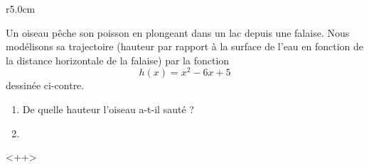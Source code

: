
\begin{exercice}\label{exosmath-0632}

\begin{wrapfigure}{r}{5.0cm}
   \vspace{-5.5cm}        %
   \centering
   
\end{wrapfigure}

    Un oiseau pêche son poisson en plongeant dans un lac depuis une falaise. Nous modélisons sa trajectoire (hauteur par rapport à la surface de l'eau en fonction de la distance horizontale de la falaise) par la fonction
    \begin{equation*}
        h(x)=x^2-6x+5
    \end{equation*}
    dessinée ci-contre.
    \begin{enumerate}
        \item
            De quelle hauteur l'oiseau a-t-il sauté ?
        \item

    \end{enumerate}
    <++>

\end{exercice}

